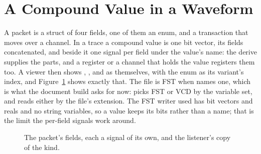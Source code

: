 \section{A Compound Value in a Waveform}
\label{sec:x-packet}

A packet is a struct of four fields, one of them an enum, and a
transaction that moves over a channel. In a trace a compound value is
one bit vector, its fields concatenated, and beside it one signal per
field under the value's name: the  derive supplies the
parts, and a register or a channel that holds the value registers them
too. A viewer then shows , ,  and
 as themselves, with the enum as its variant's index, and
Figure~\ref{fig:x-packet} shows exactly that. The file is FST when
 names one, which is what the document build asks
for now:  picks FST or VCD by the variable set,
and  reads either by the file's extension. The FST writer
used has bit vectors and reals and no string variables, so a value
keeps its bits rather than a name; that is the limit the per-field
signals work around.

\begin{figure}[htbp]
\centering

\caption{The packet's fields, each a signal of its own, and the listener's copy of the kind.}
\label{fig:x-packet}
\end{figure}




